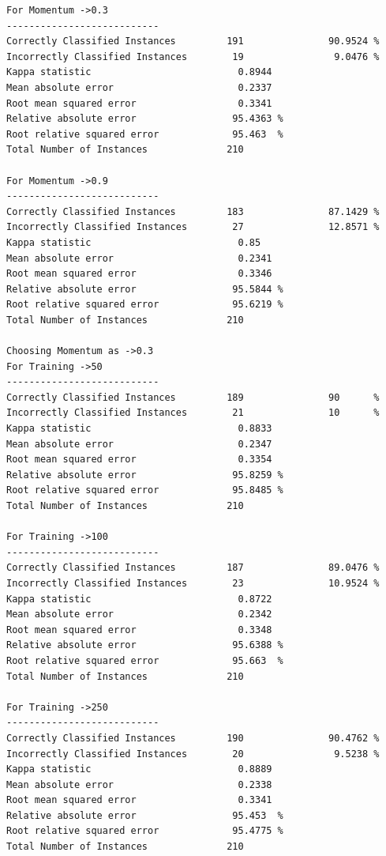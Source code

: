 \documentclass[fontsize=10pt,DIV=14]{scrartcl}
\begin{document}
\begin{itemize}
\begin{verbatim}
For Momentum ->0.3 
---------------------------
Correctly Classified Instances         191               90.9524 %
Incorrectly Classified Instances        19                9.0476 %
Kappa statistic                          0.8944
Mean absolute error                      0.2337
Root mean squared error                  0.3341
Relative absolute error                 95.4363 %
Root relative squared error             95.463  %
Total Number of Instances              210     

For Momentum ->0.9 
---------------------------
Correctly Classified Instances         183               87.1429 %
Incorrectly Classified Instances        27               12.8571 %
Kappa statistic                          0.85  
Mean absolute error                      0.2341
Root mean squared error                  0.3346
Relative absolute error                 95.5844 %
Root relative squared error             95.6219 %
Total Number of Instances              210     

Choosing Momentum as ->0.3
For Training ->50 
---------------------------
Correctly Classified Instances         189               90      %
Incorrectly Classified Instances        21               10      %
Kappa statistic                          0.8833
Mean absolute error                      0.2347
Root mean squared error                  0.3354
Relative absolute error                 95.8259 %
Root relative squared error             95.8485 %
Total Number of Instances              210     

For Training ->100 
---------------------------
Correctly Classified Instances         187               89.0476 %
Incorrectly Classified Instances        23               10.9524 %
Kappa statistic                          0.8722
Mean absolute error                      0.2342
Root mean squared error                  0.3348
Relative absolute error                 95.6388 %
Root relative squared error             95.663  %
Total Number of Instances              210     

For Training ->250 
---------------------------
Correctly Classified Instances         190               90.4762 %
Incorrectly Classified Instances        20                9.5238 %
Kappa statistic                          0.8889
Mean absolute error                      0.2338
Root mean squared error                  0.3341
Relative absolute error                 95.453  %
Root relative squared error             95.4775 %
Total Number of Instances              210     


\end{verbatim}
\end{itemize}
\end{document}
